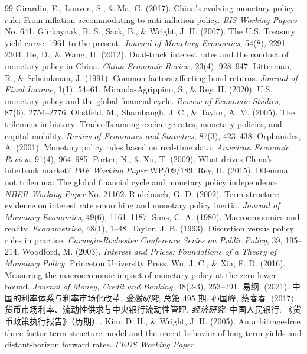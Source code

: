 \documentclass[12pt,a4paper]{ctexart}
\begin{document}
\begin{thebibliography}{99}
 Girardin, E., Lunven, S., \& Ma, G. (2017). China's evolving monetary policy rule: From inflation-accommodating to anti-inflation policy. \emph{BIS Working Papers} No. 641.
 G\"urkaynak, R. S., Sack, B., \& Wright, J. H. (2007). The U.S. Treasury yield curve: 1961 to the present. \emph{Journal of Monetary Economics}, 54(8), 2291--2304.
 He, D., \& Wang, H. (2012). Dual-track interest rates and the conduct of monetary policy in China. \emph{China Economic Review}, 23(4), 928--947.
 Litterman, R., \& Scheinkman, J. (1991). Common factors affecting bond returns. \emph{Journal of Fixed Income}, 1(1), 54--61.
 Miranda-Agrippino, S., \& Rey, H. (2020). U.S. monetary policy and the global financial cycle. \emph{Review of Economic Studies}, 87(6), 2754--2776.
 Obstfeld, M., Shambaugh, J. C., \& Taylor, A. M. (2005). The trilemma in history: Tradeoffs among exchange rates, monetary policies, and capital mobility. \emph{Review of Economics and Statistics}, 87(3), 423--438.
 Orphanides, A. (2001). Monetary policy rules based on real-time data. \emph{American Economic Review}, 91(4), 964--985.
 Porter, N., \& Xu, T. (2009). What drives China's interbank market? \emph{IMF Working Paper} WP/09/189.
 Rey, H. (2015). Dilemma not trilemma: The global financial cycle and monetary policy independence. \emph{NBER Working Paper} No. 21162.
 Rudebusch, G. D. (2002). Term structure evidence on interest rate smoothing and monetary policy inertia. \emph{Journal of Monetary Economics}, 49(6), 1161--1187.
 Sims, C. A. (1980). Macroeconomics and reality. \emph{Econometrica}, 48(1), 1--48.
 Taylor, J. B. (1993). Discretion versus policy rules in practice. \emph{Carnegie-Rochester Conference Series on Public Policy}, 39, 195--214.
 Woodford, M. (2003). \emph{Interest and Prices: Foundations of a Theory of Monetary Policy}. Princeton University Press.
 Wu, J. C., \& Xia, F. D. (2016). Measuring the macroeconomic impact of monetary policy at the zero lower bound. \emph{Journal of Money, Credit and Banking}, 48(2-3), 253--291.
 易纲. (2021). 中国的利率体系与利率市场化改革. \emph{金融研究}, 总第 495 期.
 孙国峰, 蔡春春. (2017). 货币市场利率、流动性供求与中央银行流动性管理. \emph{经济研究}.
 中国人民银行. 《货币政策执行报告》（历期）.
 Kim, D. H., \& Wright, J. H. (2005). An arbitrage-free three-factor term structure model and the recent behavior of long-term yields and distant-horizon forward rates. \emph{FEDS Working Paper}.

\end{thebibliography}
\end{document}
